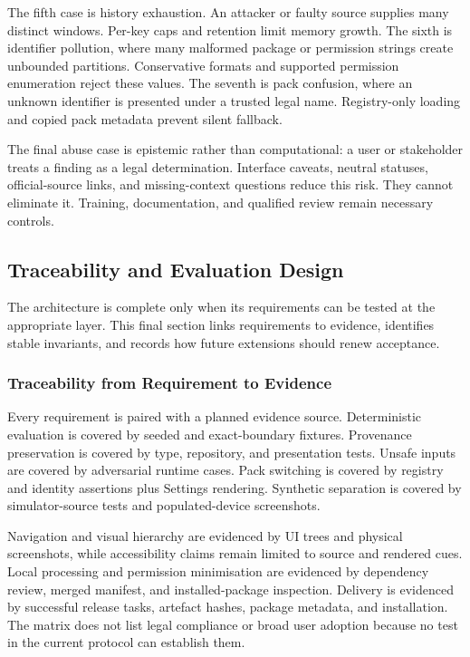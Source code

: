The fifth case is history exhaustion. An attacker or faulty source supplies many distinct windows. Per-key caps and retention limit memory growth. The sixth is identifier pollution, where many malformed package or permission strings create unbounded partitions. Conservative formats and supported permission enumeration reject these values. The seventh is pack confusion, where an unknown identifier is presented under a trusted legal name. Registry-only loading and copied pack metadata prevent silent fallback.

The final abuse case is epistemic rather than computational: a user or stakeholder treats a finding as a legal determination. Interface caveats, neutral statuses, official-source links, and missing-context questions reduce this risk. They cannot eliminate it. Training, documentation, and qualified review remain necessary controls.

\subsection{Traceability and Evaluation Design}

The architecture is complete only when its requirements can be tested at the appropriate layer. This final section links requirements to evidence, identifies stable invariants, and records how future extensions should renew acceptance.

\subsubsection{Traceability from Requirement to Evidence}

Every requirement is paired with a planned evidence source. Deterministic evaluation is covered by seeded and exact-boundary fixtures. Provenance preservation is covered by type, repository, and presentation tests. Unsafe inputs are covered by adversarial runtime cases. Pack switching is covered by registry and identity assertions plus Settings rendering. Synthetic separation is covered by simulator-source tests and populated-device screenshots.

Navigation and visual hierarchy are evidenced by UI trees and physical screenshots, while accessibility claims remain limited to source and rendered cues. Local processing and permission minimisation are evidenced by dependency review, merged manifest, and installed-package inspection. Delivery is evidenced by successful release tasks, artefact hashes, package metadata, and installation. The matrix does not list legal compliance or broad user adoption because no test in the current protocol can establish them.

